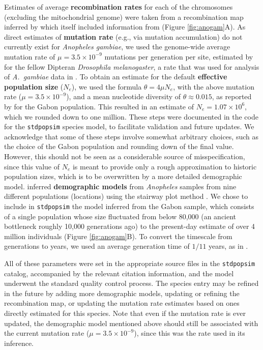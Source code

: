 \documentclass[hidelinks]{article}
\newcommand{\stdpopsim}{\texttt{stdpopsim}\xspace}
\begin{document}

Estimates of average \textbf{recombination rates} for each of the chromosomes (excluding the mitochondrial genome)
were taken from a recombination map inferred by \citet{Pombi2006} which itself included information from
\citet{zheng1996integrated} (Figure \ref{fig:anogam}A).
As direct estimates of \textbf{mutation rate} (e.g., via mutation accumulation) do not currently exist for \emph{Anopheles gambiae},
we used the genome-wide average mutation rate of $\mu=3.5 \times 10^{-9}$ mutations per generation per site,
estimated by \cite{Keightley2009} for the fellow Dipteran \textit{Drosophila melanogaster},
a rate that was used for analysis of \textit{A.~gambiae} data in \citet{Miles2017}.
To obtain an estimate for the default \textbf{effective population size} ($N_e$),
we used the formula $\theta=4\mu N_e$,
with the above mutation rate ($\mu=3.5 \times 10^{-9}$),
and a mean nucleotide diversity of $\theta\approx 0.015$,
as reported by \citet{Miles2017} for the Gabon population.
This resulted in an estimate of $N_e=1.07\times 10^{6}$,
which we rounded down to one million. 
These steps were documented in the code for the \stdpopsim species model,
to facilitate validation and future updates.
We acknowledge that some of these steps involve somewhat arbitrary choices,
such as the choice of the Gabon population and rounding down of the final value.
However, this should not be seen as a considerable source of misspecification,
since this value of $N_e$ is meant to provide only a rough approximation to
historic population sizes, which is to be overwritten by a more detailed demographic model.
\citet{Miles2017} inferred \textbf{demographic models} from \textit{Anopheles} samples from nine different populations (locations) using the stairway plot method \citep{Liu2015}.
We chose to include in \stdpopsim the model inferred from the Gabon sample, 
which consists of a single population whose size fluctuated from below 80,000
(an ancient bottleneck roughly 10,000 generations ago) to the present-day estimate of over 4 million individuals (Figure \ref{fig:anogam}B).
To convert the timescale from generations to years,
we used an average generation time of $1/11$ years,
as in \cite{Miles2017}.


All of these parameters were set in the appropriate source files in the \stdpopsim catalog,
accompanied by the relevant citation information,
and the model underwent the standard quality control process.
The species entry may be refined in the future by adding more demographic models,
updating or refining the recombination map,
or updating the mutation rate estimates based on ones directly estimated for this species.
Note that even if the mutation rate is ever updated,
the demographic model mentioned above should still be associated with the current
mutation rate ($\mu=3.5 \times 10^{-9}$),
since this was the rate used in its inference.
\end{document}
